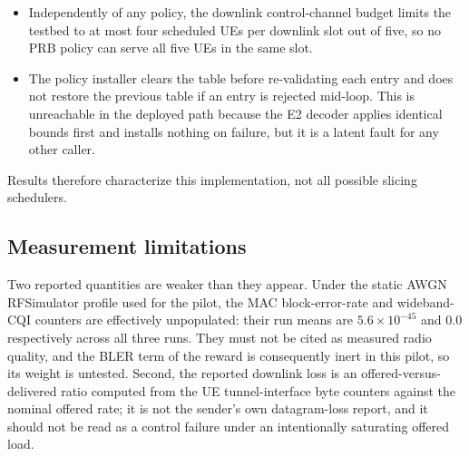 \begin{itemize}
  \item Independently of any policy, the downlink control-channel budget limits the testbed to at most four scheduled UEs per downlink slot out of five, so no PRB policy can serve all five UEs in the same slot.
  \item The policy installer clears the table before re-validating each entry and does not restore the previous table if an entry is rejected mid-loop. This is unreachable in the deployed path because the E2 decoder applies identical bounds first and installs nothing on failure, but it is a latent fault for any other caller.
\end{itemize}
Results therefore characterize this implementation, not all possible slicing schedulers.

\subsection{Measurement limitations}
Two reported quantities are weaker than they appear. Under the static AWGN RFSimulator profile used for the pilot, the MAC block-error-rate and wideband-CQI counters are effectively unpopulated: their run means are $5.6\times10^{-45}$ and $0.0$ respectively across all three runs. They must not be cited as measured radio quality, and the BLER term of the reward is consequently inert in this pilot, so its weight is untested. Second, the reported downlink loss is an offered-versus-delivered ratio computed from the UE tunnel-interface byte counters against the nominal offered rate; it is not the sender's own datagram-loss report, and it should not be read as a control failure under an intentionally saturating offered load.


